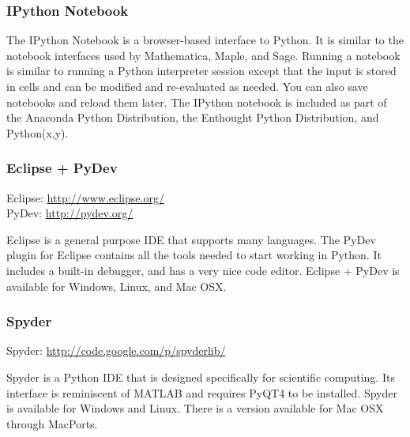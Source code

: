\subsubsection*{IPython Notebook}
The IPython Notebook is a browser-based interface to Python.
It is similar to the notebook interfaces used by Mathematica, Maple, and Sage.
Running a notebook is similar to running a Python interpreter session except that
the input is stored in cells and can be modified and re-evaluated as needed.
You can also save notebooks and reload them later.
The IPython notebook is included as part of the Anaconda Python Distribution, the
Enthought Python Distribution, and Python(x,y).

\subsubsection*{Eclipse + PyDev}

Eclipse: \url{http://www.eclipse.org/} \\
PyDev: \url{http://pydev.org/}

Eclipse is a general purpose IDE that supports many languages.
The PyDev plugin for Eclipse contains all the tools needed to start working in Python.
It includes a built-in debugger, and has a very nice code editor.
Eclipse + PyDev is available for Windows, Linux, and Mac OSX.

\subsubsection*{Spyder}

Spyder: \url{http://code.google.com/p/spyderlib/}

Spyder is a Python IDE that is designed specifically for scientific computing.
Its interface is reminiscent of MATLAB and requires PyQT4 to be installed.
Spyder is available for Windows and Linux.
There is a version available for Mac OSX through MacPorts.


